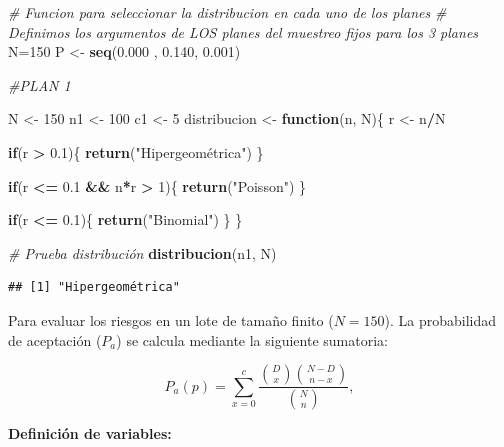 \documentclass[
  12pt,
]{article}
\newenvironment{Shaded}{\begin{snugshade}}{\end{snugshade}}
\newcommand{\CommentTok}[1]{\textcolor[rgb]{0.56,0.35,0.01}{\textit{#1}}}
\newcommand{\ControlFlowTok}[1]{\textcolor[rgb]{0.13,0.29,0.53}{\textbf{#1}}}
\newcommand{\DecValTok}[1]{\textcolor[rgb]{0.00,0.00,0.81}{#1}}
\newcommand{\FloatTok}[1]{\textcolor[rgb]{0.00,0.00,0.81}{#1}}
\newcommand{\FunctionTok}[1]{\textcolor[rgb]{0.13,0.29,0.53}{\textbf{#1}}}
\newcommand{\NormalTok}[1]{#1}
\newcommand{\OtherTok}[1]{\textcolor[rgb]{0.56,0.35,0.01}{#1}}
\newcommand{\SpecialCharTok}[1]{\textcolor[rgb]{0.81,0.36,0.00}{\textbf{#1}}}
\newcommand{\StringTok}[1]{\textcolor[rgb]{0.31,0.60,0.02}{#1}}
\begin{document}
\begin{Shaded}
\begin{Highlighting}[]
\CommentTok{\# Funcion para seleccionar la distribucion en cada uno de los planes }
\CommentTok{\# Definimos los argumentos de LOS planes del muestreo fijos para los 3 planes}
\NormalTok{N}\OtherTok{=}\DecValTok{150}
\NormalTok{P }\OtherTok{\textless{}{-}} \FunctionTok{seq}\NormalTok{(}\FloatTok{0.000}\NormalTok{ , }\FloatTok{0.140}\NormalTok{, }\FloatTok{0.001}\NormalTok{)}

\CommentTok{\#PLAN 1}

\NormalTok{N }\OtherTok{\textless{}{-}} \DecValTok{150}
\NormalTok{n1 }\OtherTok{\textless{}{-}} \DecValTok{100}
\NormalTok{c1 }\OtherTok{\textless{}{-}} \DecValTok{5}
\NormalTok{distribucion }\OtherTok{\textless{}{-}} \ControlFlowTok{function}\NormalTok{(n, N)\{}
\NormalTok{  r }\OtherTok{\textless{}{-}}\NormalTok{ n}\SpecialCharTok{/}\NormalTok{N}
  
  \ControlFlowTok{if}\NormalTok{(r }\SpecialCharTok{\textgreater{}} \FloatTok{0.1}\NormalTok{)\{}
    \FunctionTok{return}\NormalTok{(}\StringTok{"Hipergeométrica"}\NormalTok{)}
\NormalTok{  \}}
  
  \ControlFlowTok{if}\NormalTok{(r }\SpecialCharTok{\textless{}=} \FloatTok{0.1} \SpecialCharTok{\&\&}\NormalTok{ n}\SpecialCharTok{*}\NormalTok{r }\SpecialCharTok{\textgreater{}} \DecValTok{1}\NormalTok{)\{}
    \FunctionTok{return}\NormalTok{(}\StringTok{"Poisson"}\NormalTok{)}
\NormalTok{  \}}
  
  \ControlFlowTok{if}\NormalTok{(r }\SpecialCharTok{\textless{}=} \FloatTok{0.1}\NormalTok{)\{}
    \FunctionTok{return}\NormalTok{(}\StringTok{"Binomial"}\NormalTok{)}
\NormalTok{  \}}
\NormalTok{\}}

\CommentTok{\# Prueba distribución}
\FunctionTok{distribucion}\NormalTok{(n1, N)}
\end{Highlighting}
\end{Shaded}

\begin{verbatim}
## [1] "Hipergeométrica"
\end{verbatim}

Para evaluar los riesgos en un lote de tamaño finito (\(N=150\)). La
probabilidad de aceptación (\(P_a\)) se calcula mediante la siguiente
sumatoria:

\[
P_a(p) = \sum_{x=0}^{c} \frac{\binom{D}{x} \binom{N-D}{n-x}}{\binom{N}{n}},
\]

\textbf{Definición de variables:}
\end{document}
